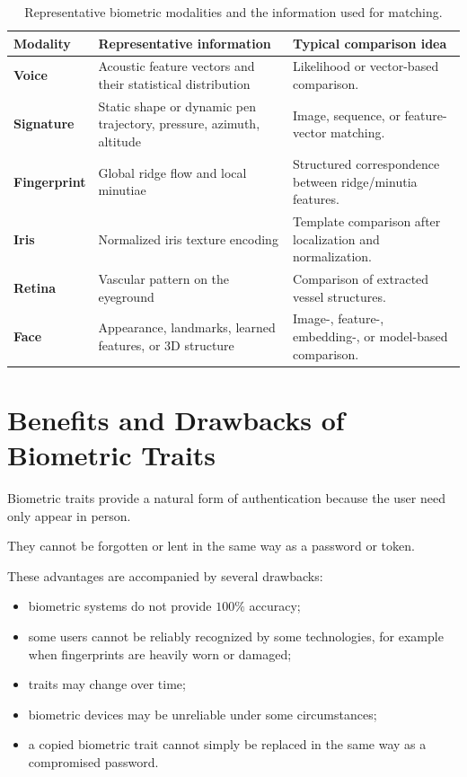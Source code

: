 \documentclass[11pt,a4paper,oneside]{report}
\begin{document}
\begin{table}[H]
\centering
\caption{Representative biometric modalities and the information used for matching.}
\label{tab:modalities}
\small
\begin{tabularx}{\textwidth}{
    >{\bfseries}P{2.4cm}
    P{5.1cm}
    X
}
\toprule
{}
Modality & \textbf{Representative information} & \textbf{Typical comparison idea} \\
\midrule
Voice & Acoustic feature vectors and their statistical distribution &
Likelihood or vector-based comparison. \\
Signature & Static shape or dynamic pen trajectory, pressure, azimuth, altitude &
Image, sequence, or feature-vector matching. \\
Fingerprint & Global ridge flow and local minutiae &
Structured correspondence between ridge/minutia features. \\
Iris & Normalized iris texture encoding &
Template comparison after localization and normalization. \\
Retina & Vascular pattern on the eyeground &
Comparison of extracted vessel structures. \\
Face & Appearance, landmarks, learned features, or 3D structure &
Image-, feature-, embedding-, or model-based comparison. \\
\bottomrule
\end{tabularx}
\end{table}

\section{Benefits and Drawbacks of Biometric Traits}
\label{subsec:benefits-drawbacks}

Biometric traits provide a natural form of authentication because the user
need only appear in person.

They cannot be forgotten or lent in the same way as a password or token.

These advantages are accompanied by several drawbacks:

\begin{itemize}
    \item biometric systems do not provide \(100\%\) accuracy;

    \item some users cannot be reliably recognized by some technologies,
    for example when fingerprints are heavily worn or damaged;

    \item traits may change over time;

    \item biometric devices may be unreliable under some circumstances;

    \item a copied biometric trait cannot simply be replaced in the same
    way as a compromised password.
\end{itemize}
\end{document}
